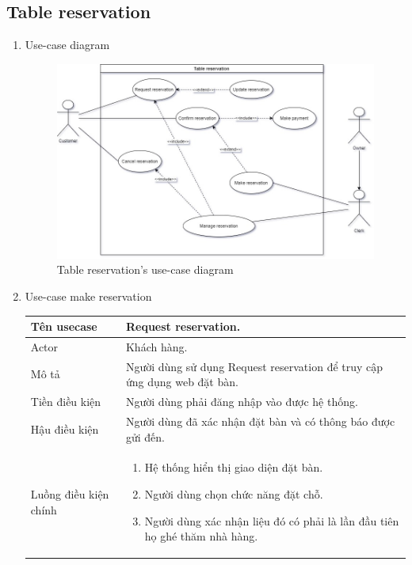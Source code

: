 \subsection{Table reservation}
\begin{enumerate}
    \item Use-case diagram
    \begin{center}
        \begin{figure}[!h]
            \begin{center}
                \includegraphics[scale=0.45]{Images/ReservationDiagram.jpg}
            \end{center} 
            \vspace{1cm}
            \caption{Table reservation's use-case diagram}
        \end{figure}    
    \end{center}
    
    \item Use-case make reservation
    \begin{center}{\color{black}}

    \begin{tabular}{|p{5cm}|p{7cm}|} \hline
        Tên usecase &  Request reservation.\\ \hline
        Actor & Khách hàng. \\\hline
        Mô tả & Người dùng sử dụng Request reservation để truy cập ứng dụng web đặt bàn.\\\hline
        Tiền điều kiện & Người dùng phải đăng nhập vào được hệ thống.\\ \hline
        Hậu điều kiện &  Người dùng đã xác nhận đặt bàn và có thông báo được gửi đến.
        \\ \hline
        Luồng điều kiện chính &  
            \begin{enumerate}[1.]
                \item Hệ thống hiển thị giao diện đặt bàn.
                \item Người dùng chọn chức năng  đặt chỗ.
                \item Người dùng xác nhận liệu đó có phải là lần đầu tiên họ ghé thăm nhà hàng.
                

\end{enumerate}
\end{tabular}
\end{center}
\end{enumerate}
